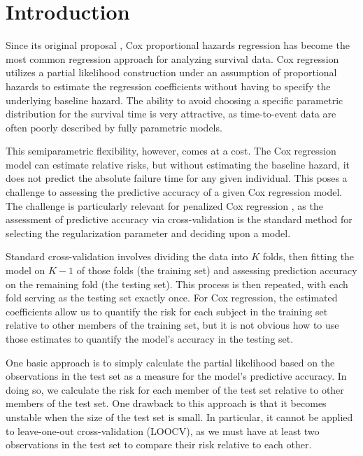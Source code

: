 \section{Introduction}

\par Since its original proposal \citep{Cox1972}, Cox proportional hazards regression has become the most common regression approach for analyzing survival data.  Cox regression utilizes a partial likelihood construction under an assumption of proportional hazards to estimate the regression coefficients without having to specify the underlying baseline hazard.  The ability to avoid choosing a specific parametric distribution for the survival time is very attractive, as time-to-event data are often poorly described by fully parametric models.

This semiparametric flexibility, however, comes at a cost. The Cox regression model can estimate relative risks, but without estimating the baseline hazard, it does not predict the absolute failure time for any given individual.  This poses a challenge to assessing the predictive accuracy of a given Cox regression model.  The challenge is particularly relevant for penalized Cox regression \citep{Tibshirani1997,Fan2002}, as the assessment of predictive accuracy via cross-validation is the standard method for selecting the regularization parameter and deciding upon a model.

\par Standard cross-validation involves dividing the data into $K$ folds, then fitting the model on $K-1$ of those folds (the training set) and assessing prediction accuracy on the remaining fold (the testing set). This process is then repeated, with each fold serving as the testing set exactly once. For Cox regression, the estimated coefficients allow us to quantify the risk for each subject in the training set relative to other members of the training set, but it is not obvious how to use those estimates to quantify the model's accuracy in the testing set.

\par One basic approach is to simply calculate the partial likelihood based on the observations in the test set as a measure for the model's predictive accuracy.  In doing so, we calculate the risk for each member of the test set relative to other members of the test set.  One drawback to this approach is that it becomes unstable when the size of the test set is small.  In particular, it cannot be applied to leave-one-out cross-validation (LOOCV), as we must have at least two observations in the test set to compare their risk relative to each other.

